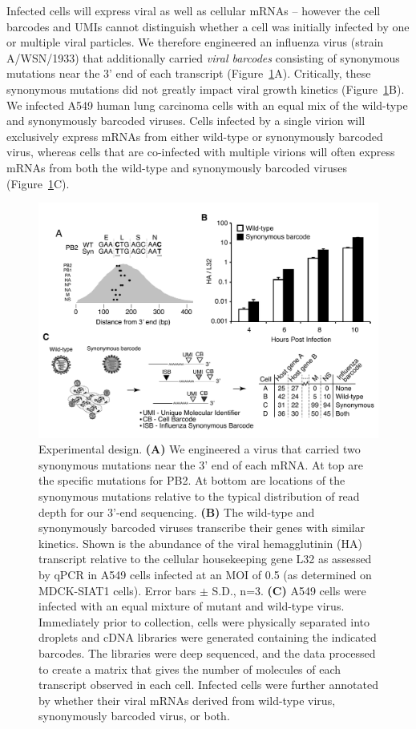 \documentclass[9pt,lineno]{elife}
\begin{document}
Infected cells will express viral as well as cellular mRNAs -- however the cell barcodes and UMIs cannot distinguish whether a cell was initially infected by one or multiple viral particles.
We therefore engineered an influenza virus (strain A/WSN/1933) that additionally carried \emph{viral barcodes} consisting of synonymous mutations near the 3' end of each transcript (Figure~\ref{fig:workflow}A).
Critically, these synonymous mutations did not greatly impact viral growth kinetics (Figure~\ref{fig:workflow}B).
We infected A549 human lung carcinoma cells with an equal mix of the wild-type and synonymously barcoded viruses.
Cells infected by a single virion will exclusively express mRNAs from either wild-type or synonymously barcoded virus, whereas cells that are co-infected with multiple virions will often express mRNAs from both the wild-type and synonymously barcoded viruses (Figure~\ref{fig:workflow}C).
\begin{figure}
\centerline{\includegraphics[width=0.8\linewidth]{figures/Workflow/workflow.pdf}}
\caption{\label{fig:workflow} Experimental design.
{\bf (A)}  
We engineered a virus that carried two synonymous mutations near the 3' end of each mRNA.
At top are the specific mutations for PB2.
At bottom are locations of the synonymous mutations relative to the typical distribution of read depth for our 3'-end sequencing.
{\bf (B)} 
The wild-type and synonymously barcoded viruses transcribe their genes with similar kinetics. 
Shown is the abundance of the viral hemagglutinin (HA) transcript relative to the cellular housekeeping gene L32 as assessed by qPCR in A549 cells infected at an MOI of 0.5 (as determined on MDCK-SIAT1 cells).
Error bars $\pm$ S.D., n=3.
{\bf (C)}  
A549 cells were infected with an equal mixture of mutant and wild-type virus. 
Immediately prior to collection, cells were physically separated into droplets and cDNA libraries were generated containing the indicated barcodes. 
The libraries were deep sequenced, and the data processed to create a matrix that gives the number of molecules of each transcript observed in each cell.
Infected cells were further annotated by whether their viral mRNAs derived from wild-type virus, synonymously barcoded virus, or both.
}
\end{figure}
\end{document}
